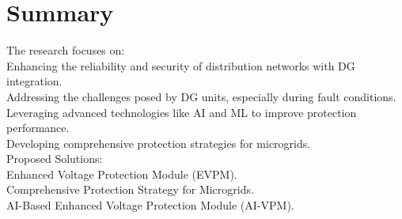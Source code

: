 \section{Summary} 

The research focuses on:\\
	Enhancing the reliability and security of distribution networks with DG integration.\\
	Addressing the challenges posed by DG units, especially during fault conditions.\\
	Leveraging advanced technologies like AI and ML to improve protection performance.\\
	Developing comprehensive protection strategies for microgrids.\\
Proposed Solutions:\\
	Enhanced Voltage Protection Module (EVPM).\\
	Comprehensive Protection Strategy for Microgrids.\\
	AI-Based Enhanced Voltage Protection Module (AI-VPM).\\



